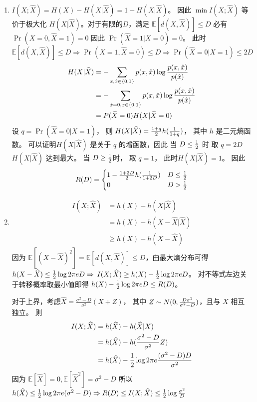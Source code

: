 \documentclass{article}
\def\E{\mathbb{E}}
\begin{document}
\begin{enumerate}
\item
$ I(X; \widehat{X} ) = H(X) - H(X | \widehat{X}) = 1  - H(X | \widehat{X})$。 因此 $ \min I(X; \widehat{X}) $
等价于极大化 $ H(X | \widehat{X}) $。对于有限的$D$，满足 $\E[ d(X, \widehat{X}) ] \leq D$ 必有$ \Pr(X = 0, \widehat{X} = 1) = 0 $
因此 $ \Pr(\widehat{X} = 1 | X = 0) = 0 $。
此时$ \E[ d(X, \widehat{X}) ] \leq D \Rightarrow \Pr(X = 1, \widehat{X} = 0 ) \leq D \Rightarrow
\Pr( \widehat{X} = 0 | X = 1 ) \leq 2D $ 
\begin{align*}
H(X | \widehat{X}) & = -\sum_{x,\hat{x} \in \{0, 1\}} p(x, \hat{x}) \log { p(x, \hat{x}) \over p(\hat{x}) }  \\
& = -\sum_{\hat{x} = 0, x \in \{0, 1\}} p(x, \hat{x}) \log { p(x, \hat{x}) \over p(\hat{x}) } \\
& = P(\widehat{X} = 0) H(X | \widehat{X} = 0)
\end{align*}
设 $ q = \Pr( \widehat{X} = 0 | X = 1 )  $， 则 $ H(X | \widehat{X} ) = { 1 + q \over 2} h( { 1 \over 1 + q} ) $，
其中 $h$ 是二元熵函数。
可以证明$ H(X | \widehat{X} )  $ 是关于 $ q $ 的增函数，因此 当 $ D \leq { 1 \over 2} $ 时 取 $ q = 2 D$ $ H(X | \widehat{X} ) $ 达到最大。 当 $ D \geq { 1\over 2} $时， 取 $ q = 1 $， 此时$ H(X | \widehat{X} ) = 1 $。
因此
$$
R(D) = \begin{cases}
1 -   { 1 + 2D \over 2} h( { 1 \over 1 + 2D} ) & D \leq { 1 \over 2} \\
0 & D > { 1 \over 2} 
\end{cases}
$$
\item
\begin{align*}
   I(X; \widehat{X}) &  =  h(X) - h( X | \widehat{X} ) \\
   & = h(X) - h( X - \widehat{X} | \widehat{X} ) \\
   & \geq h(X) - h(X - \widehat{X}) 
\end{align*}
因为 $ \E[(X-\widehat{X})^2] = \E[d(X,\widehat{X})] \leq D$，由最大熵分布可得
$ h(X - \widehat{X})  \leq { 1 \over 2} \log 2 \pi e D  \Rightarrow$
$ I(X; \widehat{X}) \geq h(X) -  { 1 \over 2} \log 2 \pi e D $。 对不等式左边关于转移概率取最小值即得
$ h(X) -  { 1 \over 2} \log 2 \pi e D  \leq R(D)$。

对于上界，考虑$ \widehat{X} = \frac{ \sigma^2 - D }{ \sigma^2} (X + Z)$， 其中 $ Z \sim N(0, 
{ D \sigma^2 \over \sigma^2 - D}) $，且与 $X$ 相互独立。
则 
\begin{align*}
I(X; \widehat{X}) & = h(\widehat{X}) - h(\widehat{X} | X ) \\
& = h(\widehat{X})  - h ( \frac{ \sigma^2 - D }{\sigma^2} Z ) \\
& = h(\widehat{X})  - {1 \over 2} \log 2\pi e {(\sigma^2 - D) D \over \sigma^2}
\end{align*}
因为 $\E[\widehat{X}] = 0, \E[\widehat{X}^2] = \sigma^2 - D $
所以 $  h(\widehat{X})  \leq { 1 \over 2} \log 2\pi e (\sigma^2 - D) \Rightarrow R(D) \leq I(X;\widehat{X}) \leq {1\over 2}\log 
{\sigma^2 \over D}$


\end{enumerate}
\end{document}
